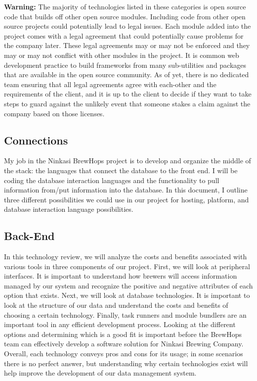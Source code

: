 \documentclass[draftclsnofoot,onecolumn,letterpaper,10pt,compsoc]{IEEEtran}
\begin{document}
  \textbf{Warning:}
  The majority of technologies listed in these categories is open source code that builds off other open source modules.
  Including code from other open source projects could potentially lead to legal issues.
  Each module added into the project comes with a legal agreement that could potentially cause problems for the company later.
  These legal agreements may or may not be enforced and they may or may not conflict with other modules in the project.
  It is common web development practice to build frameworks from many sub-utilities and packages that are available in the open source community.
  As of yet, there is no dedicated team ensuring that all legal agreements agree with each-other and the requirements of the client, and it is up to the client to decide if they want to take steps to guard against the unlikely event that someone stakes a claim against the company based on those licenses.

  \subsection{Connections}
  My job in the Ninkasi BrewHops project is to develop and organize the middle of the stack: the languages that connect the database to the front end.
  I will be coding the database interaction languages and the functionality to pull information from/put information into the database.
  In this document, I outline three different possibilities we could use in our project for hosting, platform, and database interaction language possibilities.

  \subsection{Back-End}
  In this technology review, we will analyze the costs and benefits associated with various tools in three components of our project.
  First, we will look at peripheral interfaces.
  It is important to understand how brewers will access information managed by our system and recognize the positive and negative attributes of each option that exists.
  Next, we will look at database technologies.
  It is important to look at the structure of our data and understand the costs and benefits of choosing a certain technology.
  Finally, task runners and module bundlers are an important tool in any efficient development process.
  Looking at the different options and determining which is a good fit is important before the BrewHops team can effectively develop a software solution for Ninkasi Brewing Company.
  Overall, each technology conveys pros and cons for its usage; in some scenarios there is no perfect answer, but understanding why certain technologies exist will help improve the development of our data management system.
\end{document}
